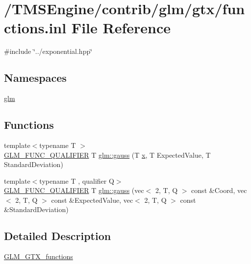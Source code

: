 \hypertarget{functions_8inl}{}\section{/\+T\+M\+S\+Engine/contrib/glm/gtx/functions.inl File Reference}
\label{functions_8inl}
{\ttfamily \#include \char`\"{}../exponential.\+hpp\char`\"{}}\newline
\subsection*{Namespaces}
\begin{DoxyCompactItemize}
\item 
 \hyperlink{namespaceglm}{glm}
\end{DoxyCompactItemize}
\subsection*{Functions}
\begin{DoxyCompactItemize}
\item 
{\footnotesize template$<$typename T $>$ }\\\hyperlink{setup_8hpp_a33fdea6f91c5f834105f7415e2a64407}{G\+L\+M\+\_\+\+F\+U\+N\+C\+\_\+\+Q\+U\+A\+L\+I\+F\+I\+ER} T \hyperlink{group__gtx__functions_ga0b50b197ff74261a0fad90f4b8d24702}{glm\+::gauss} (T \hyperlink{_s_d_l__opengl_8h_ad0e63d0edcdbd3d79554076bf309fd47}{x}, T Expected\+Value, T Standard\+Deviation)
\item 
{\footnotesize template$<$typename T , qualifier Q$>$ }\\\hyperlink{setup_8hpp_a33fdea6f91c5f834105f7415e2a64407}{G\+L\+M\+\_\+\+F\+U\+N\+C\+\_\+\+Q\+U\+A\+L\+I\+F\+I\+ER} T \hyperlink{group__gtx__functions_gad19ec8754a83c0b9a8dc16b7e60705ab}{glm\+::gauss} (vec$<$ 2, T, Q $>$ const \&Coord, vec$<$ 2, T, Q $>$ const \&Expected\+Value, vec$<$ 2, T, Q $>$ const \&Standard\+Deviation)
\end{DoxyCompactItemize}


\subsection{Detailed Description}
\hyperlink{group__gtx__functions}{G\+L\+M\+\_\+\+G\+T\+X\+\_\+functions} 